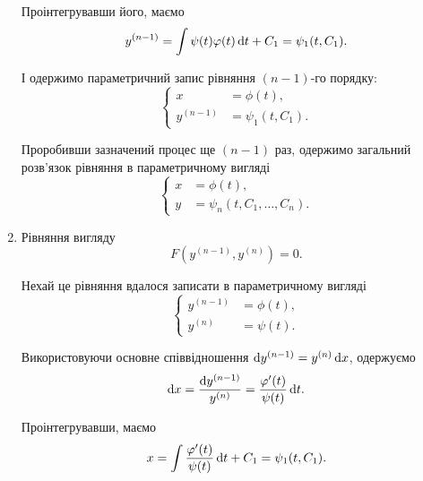\begin{enumerate}
    Проінтегрувавши його, маємо 
      \begin{equation*}
    	y^{(n-1)} = \int \psi(t)  \varphi(t)  \mathop{}\!\mathrm{d} t + C_1 = \psi_1(t, C_1).
    \end{equation*}
    
    І одержимо параметричний запис рівняння $(n-1)$-го порядку:
    \begin{equation*}
    	\left\{
    		\begin{aligned}
    			x &= \phi(t), \\
    			y^{(n-1)} &= \psi_1(t, C_1).
    		\end{aligned}
    	\right.
    \end{equation*}
    
    Проробивши зазначений процес ще $(n-1)$ раз, одержимо загальний розв'язок рівняння в параметричному вигляді
    \begin{equation*}
    	\left\{
    		\begin{aligned}
    			x &= \phi(t), \\
    			y &= \psi_n(t, C_1, \ldots, C_n).
    		\end{aligned}
    	\right.
    \end{equation*}
     
    \item Рівняння вигляду
    \begin{equation*}
    	F \left( y^{(n-1)}, y^{(n)} \right) = 0.
    \end{equation*}
    
    Нехай це рівняння вдалося записати в параметричному вигляді 
    \begin{equation*}
    	\left\{
    		\begin{aligned}
    			y^{(n-1)} &= \phi(t), \\
    			y^{(n)} &= \psi(t).
    		\end{aligned}
    	\right.
    \end{equation*}
    
    Використовуючи основне співвідношення $\mathop{}\!\mathrm{d} y^{(n-1)} = y^{(n)}  \mathop{}\!\mathrm{d} x$, одержуємо
    \begin{equation*}
    	\mathop{}\!\mathrm{d} x = \frac{\mathop{}\!\mathrm{d} y^{(n-1)}}{y^{(n)}} = \frac{\varphi'(t)}{\psi(t)}  \mathop{}\!\mathrm{d} t.
    \end{equation*}
    
    Проінтегрувавши, маємо
    \begin{equation*}
    	x = \int \frac{\varphi'(t)}{\psi(t)}  \mathop{}\!\mathrm{d} t + C_1 = \psi_1(t, C_1).
    \end{equation*}
    

\end{enumerate}
